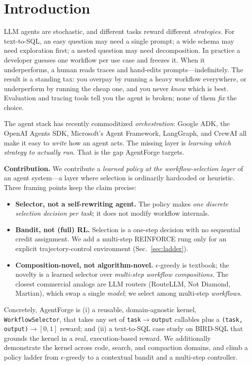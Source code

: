 \documentclass[conference]{IEEEtran}
\newcommand{\code}[1]{\texttt{#1}}
\begin{document}
\section{Introduction}
LLM agents are stochastic, and different tasks reward different \emph{strategies}.
For text-to-SQL, an easy question may need a single prompt; a wide schema may need
exploration first; a nested question may need decomposition. In practice a developer
guesses one workflow per use case and freezes it. When it underperforms, a human
reads traces and hand-edits prompts---indefinitely. The result is a standing tax:
you overpay by running a heavy workflow everywhere, or underperform by running the
cheap one, and you never \emph{know} which is best. Evaluation and tracing tools tell
you the agent is broken; none of them \emph{fix} the choice.

The agent stack has recently commoditized \emph{orchestration}: Google ADK, the
OpenAI Agents SDK, Microsoft's Agent Framework, LangGraph, and CrewAI all make it
easy to \emph{write} how an agent acts. The missing layer is \emph{learning which
strategy to actually run}. That is the gap AgentForge targets.

\textbf{Contribution.} We contribute a \emph{learned policy at the
workflow-selection layer} of an agent system---a layer where selection is
ordinarily hardcoded or heuristic. Three framing points keep the claim precise:

\begin{itemize}
  \item \textbf{Selector, not a self-rewriting agent.} The policy makes \emph{one
  discrete selection decision per task}; it does not modify workflow internals.
  \item \textbf{Bandit, not (full) RL.} Selection is a one-step decision with no
  sequential credit assignment. We add a multi-step REINFORCE rung only for an
  explicit trajectory-control environment (Sec.~\ref{sec:ladder}).
  \item \textbf{Composition-novel, not algorithm-novel.} $\epsilon$-greedy is
  textbook; the novelty is a learned selector over \emph{multi-step workflow
  compositions}. The closest commercial analogs are LLM routers (RouteLLM, Not
  Diamond, Martian), which swap a single \emph{model}; we select among multi-step
  \emph{workflows}.
\end{itemize}

Concretely, AgentForge is (i) a reusable, domain-agnostic kernel,
\code{WorkflowSelector}, that takes any set of \code{task}$\rightarrow$\code{output}
callables plus a \code{(task, output)}$\rightarrow[0,1]$ reward; and (ii) a
text-to-SQL case study on BIRD-SQL that grounds the kernel in a real,
execution-based reward. We additionally demonstrate the kernel across code, search,
and compaction domains, and climb a policy ladder from $\epsilon$-greedy to a
contextual bandit and a multi-step controller.
\end{document}
